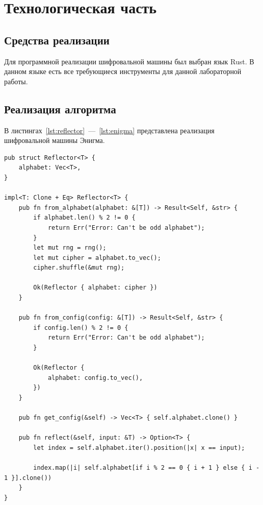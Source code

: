 \chapter{Технологическая часть}

\section{Средства реализации}

Для программной реализации шифровальной машины был выбран язык Rust. В данном языке есть все требующиеся инструменты для данной лабораторной работы.

\section{Реализация алгоритма}

В листингах~\ref{lst:reflector}~---~\ref{lst:enigma} представлена реализация шифровальной машины Энигма.

\begin{center}
\captionsetup{justification=raggedright,singlelinecheck=off}
\begin{lstlisting}[label=lst:reflector,caption=реализация рефлектора]
pub struct Reflector<T> {
    alphabet: Vec<T>,
}

impl<T: Clone + Eq> Reflector<T> {
    pub fn from_alphabet(alphabet: &[T]) -> Result<Self, &str> {
        if alphabet.len() % 2 != 0 {
            return Err("Error: Can't be odd alphabet");
        }
        let mut rng = rng();
        let mut cipher = alphabet.to_vec();
        cipher.shuffle(&mut rng);

        Ok(Reflector { alphabet: cipher })
    }

    pub fn from_config(config: &[T]) -> Result<Self, &str> {
        if config.len() % 2 != 0 {
            return Err("Error: Can't be odd alphabet");
        }

        Ok(Reflector {
            alphabet: config.to_vec(),
        })
    }

    pub fn get_config(&self) -> Vec<T> { self.alphabet.clone() }

    pub fn reflect(&self, input: &T) -> Option<T> {
        let index = self.alphabet.iter().position(|x| x == input);

        index.map(|i| self.alphabet[if i % 2 == 0 { i + 1 } else { i - 1 }].clone())
    }
}
\end{lstlisting}
\end{center}

